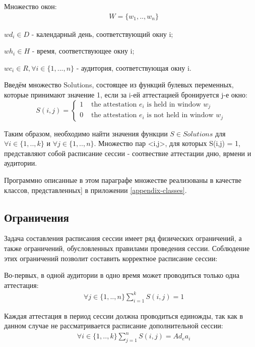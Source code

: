Множество окон:
\begin{align}
	& W =  \{w_1,..,w_n\} 
\end{align}

${wd_i \in D}$ - календарный день, соответствующий окну i;

${wh_i \in H}$ - время, соответствующее окну i;

${wc_i\in{}R , \forall  i \in{} \{1,...,n\}}$ - аудитория, соответствующая окну i.


Введём множество Solutions, состоящее из функций булевых переменных, которые принимают значение 1, если за i-ей аттестацией бронируется j-е окно:
\begin{equation}
	S(i,j) = 
	\begin{cases}
		1 &\text{ the attestation $e_i$ is held in window $w_j$} \\
		0 &\text{ the attestation $e_i$ is not held in window $w_j$}
	\end{cases}
\end{equation}

Таким образом, необходимо найти значения функции ${S \in Solutions}$ для ${ \forall  i  \in \{1,..,k\}}$  и  ${ \forall j \in \{1,..,n\}}$. Множество пар <i,j>, для которых S(i,j) = 1, представляют собой расписание сессии - соотвествие аттестации дню, врмени и аудитории.

Программно описанные в этом параграфе множестве реализованы в качестве классов, представленных] в приложении \ref{appendix-classes}.

\subsection{Ограничения}
Задача составления расписания сессии имеет ряд физических ограничений, а также ограничений, обусловленных правилами проведения сессии. Соблюдение этих ограничений позволит составить корректное расписание сессии:

Во-первых, в одной аудитории в одно время может проводиться только одна аттестация:
\begin{align}
	& \forall  j \in \{1,..,n\} \sum_{i=1}^kS(i,j) = 1
\end{align}

Каждая аттестация в период сессии должна проводиться единожды, так как в данном случае не рассматривается расписание дополнительной сессии:
\begin{align}
	& \forall  i \in \{1,..,k\} \sum_{j=1}^nS(i,j) = Ad_ea_i
\end{align}

